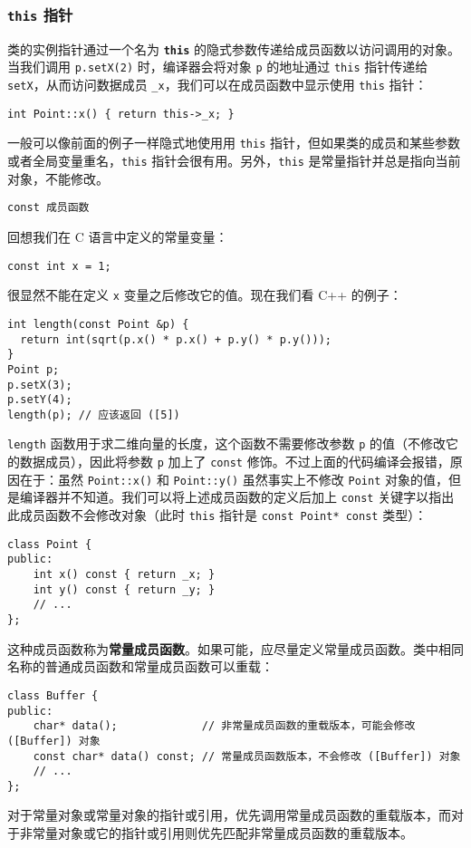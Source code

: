 \documentclass[hyperref,UTF8]{article}
\begin{document}
\subsubsection{\texttt{this} 指针}

类的实例指针通过一个名为 \textbf{\texttt{this}} 的隐式参数传递给成员函数以访问调用的对象。当我们调用 \texttt{p.setX(2)} 时，编译器会将对象 \texttt{p} 的地址通过 \texttt{this} 指针传递给 \texttt{setX}，从而访问数据成员 \texttt{\_x}，我们可以在成员函数中显示使用 \texttt{this} 指针：
\begin{lstlisting}
int Point::x() { return this->_x; }
\end{lstlisting}
一般可以像前面的例子一样隐式地使用用 \texttt{this} 指针，但如果类的成员和某些参数或者全局变量重名，\texttt{this} 指针会很有用。另外，\texttt{this} 是常量指针并总是指向当前对象，不能修改。

\texttt{const 成员函数}

回想我们在 C 语言中定义的常量变量：
\begin{lstlisting}[numbers=none]
const int x = 1;
\end{lstlisting}
很显然不能在定义 \texttt{x} 变量之后修改它的值。现在我们看 C++ 的例子：
\begin{lstlisting}
int length(const Point &p) {
  return int(sqrt(p.x() * p.x() + p.y() * p.y()));
}
Point p;
p.setX(3);
p.setY(4);
length(p); // 应该返回 ([5])
\end{lstlisting}
\texttt{length} 函数用于求二维向量的长度，这个函数不需要修改参数 \texttt{p} 的值（不修改它的数据成员），因此将参数 \texttt{p} 加上了 \texttt{const} 修饰。不过上面的代码编译会报错，原因在于：虽然 \texttt{Point::x()} 和 \texttt{Point::y()} 虽然事实上不修改 \texttt{Point} 对象的值，但是编译器并不知道。我们可以将上述成员函数的定义后加上 \texttt{const} 关键字以指出此成员函数不会修改对象（此时 \texttt{this} 指针是 \texttt{const Point* const} 类型）：
\begin{lstlisting}
class Point {
public:
    int x() const { return _x; }
    int y() const { return _y; }
    // ...
};
\end{lstlisting}
这种成员函数称为\textbf{常量成员函数}。如果可能，应尽量定义常量成员函数。类中相同名称的普通成员函数和常量成员函数可以重载：
\begin{lstlisting}
class Buffer {
public:
    char* data();             // 非常量成员函数的重载版本，可能会修改 ([Buffer]) 对象
    const char* data() const; // 常量成员函数版本，不会修改 ([Buffer]) 对象
    // ...
};
\end{lstlisting}
对于常量对象或常量对象的指针或引用，优先调用常量成员函数的重载版本，而对于非常量对象或它的指针或引用则优先匹配非常量成员函数的重载版本。
\end{document}
